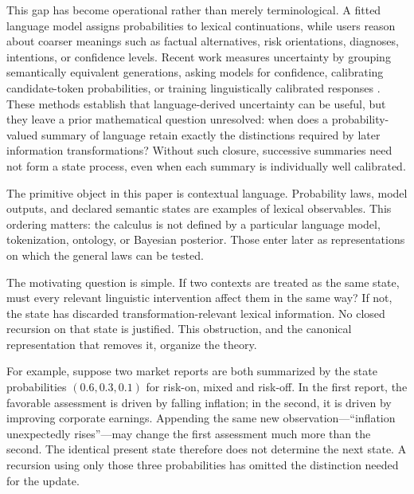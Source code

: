 \documentclass[11pt]{article}
\begin{document}
This gap has become operational rather than merely terminological. A fitted language model assigns probabilities to lexical continuations, while users reason about coarser meanings such as factual alternatives, risk orientations, diagnoses, intentions, or confidence levels. Recent work measures uncertainty by grouping semantically equivalent generations, asking models for confidence, calibrating candidate-token probabilities, or training linguistically calibrated responses \cite{band2024,farquhar2024,kadavath2022,kuhn2023,kumar2024,tian2023}. These methods establish that language-derived uncertainty can be useful, but they leave a prior mathematical question unresolved: when does a probability-valued summary of language retain exactly the distinctions required by later information transformations? Without such closure, successive summaries need not form a state process, even when each summary is individually well calibrated.

The primitive object in this paper is contextual language. Probability laws, model outputs, and declared semantic states are examples of lexical observables. This ordering matters: the calculus is not defined by a particular language model, tokenization, ontology, or Bayesian posterior. Those enter later as representations on which the general laws can be tested.

The motivating question is simple. If two contexts are treated as the same state, must every relevant linguistic intervention affect them in the same way? If not, the state has discarded transformation-relevant lexical information. No closed recursion on that state is justified. This obstruction, and the canonical representation that removes it, organize the theory.

For example, suppose two market reports are both summarized by the state
probabilities $(0.6,0.3,0.1)$ for risk-on, mixed and risk-off.  In the first
report, the favorable assessment is driven by falling inflation; in the
second, it is driven by improving corporate earnings.  Appending the same new
observation---``inflation unexpectedly rises''---may change the first
assessment much more than the second.  The identical present state therefore
does not determine the next state.  A recursion using only those three
probabilities has omitted the distinction needed for the update.
\end{document}
